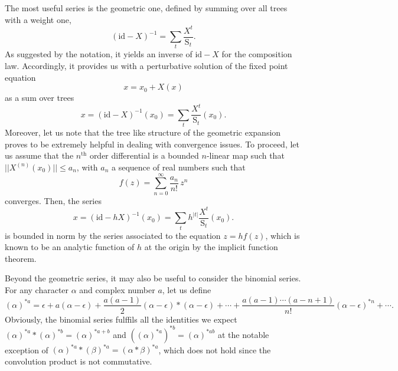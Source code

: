 \documentclass[10pt,here,feynmf]{article}
\begin{document}
The most useful series is the geometric one, defined by summing over all trees with a weight one, 
\begin{equation}
(\mathrm{id}-X)^{-1}=\sum_{t}\frac{X^{t}}{\mathrm{S}_{t}}. \label{geometrictree}
\end{equation}
As suggested by the notation, it yields an inverse of $\mathrm{id}-X$ for the composition law. Accordingly, it provides us with a perturbative solution of the fixed point equation
\begin{equation}
x=x_{0}+X(x)\label{fixedpoint}
\end{equation}
as a sum over trees
\begin{equation}
 x=(\mathrm{id}-X)^{-1}(x_{0})=\sum_{t}\frac{X^{t}}{\mathrm{S}_{t}}(x_{0}).
\end{equation}
Moreover, let us note that the tree like structure of the geometric expansion proves to be extremely helpful in dealing with convergence issues. To proceed, let us assume that the $n^{\mathrm{th}}$ order differential is  a bounded $n$-linear map such that $||X^{(n)}(x_{0})||\leq a_{n}$, with $a_{n}$ a sequence of real numbers such that
\begin{equation}
f(z)=\sum_{n=0}^{\infty}\frac{a_{n}}{n!}\,z^{n}
\end{equation}
converges. Then, the series 
\begin{equation}
 x=(\mathrm{id}-hX)^{-1}(x_{0})=\sum_{t}h^{|t|}\frac{X^{t}}{\mathrm{S}_{t}}(x_{0}).
\end{equation}
is bounded in norm by the series associated to the equation $z=hf(z)$, which is known to be an analytic function of $h$ at the origin by the implicit function theorem. 

Beyond the geometric series, it may also be useful to consider the binomial series.  For any character $\alpha$ and complex number $a$, let us define
\begin{equation}
(\alpha)^{\ast a}=\epsilon+
a(\alpha\!-\!\epsilon)+\frac{a(a-1)}{2}(\alpha\!-\!\epsilon)\ast(\alpha\!-\!\epsilon)+\cdots+
\frac{a(a-1)\cdots(a-n+1)}{n!}(\alpha\!-\!\epsilon)^{\ast n}+\cdots.\label{binomial}
\end{equation}
Obviously, the binomial series fulffils all the identities we expect
$(\alpha)^{\ast a}\ast(\alpha)^{\ast b}=(\alpha)^{\ast a+b}$ and $((\alpha)^{\ast a})^{\ast b}=(\alpha)^{\ast ab}$ at the notable exception of $(\alpha)^{\ast a}\ast (\beta)^{\ast a}=(\alpha\ast\beta)^{\ast a}$, which does not hold since  the convolution product is not commutative.  
\end{document}
